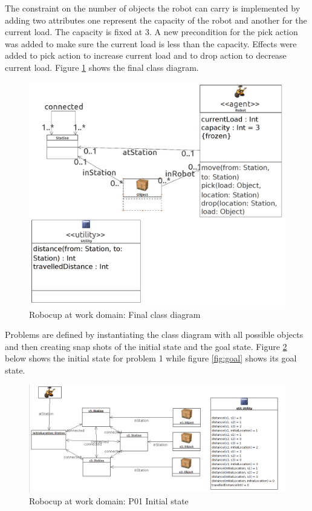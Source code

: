 \documentclass{article}
\begin{document}
The constraint on the number of objects the robot can carry is implemented by adding two attributes one represent the capacity of the robot and another for the current load. The capacity is fixed at 3. A new precondition for the pick action was added to make sure the current load is less than the capacity. Effects were added to pick action to increase current load and to drop action to decrease current load. Figure \ref{fig:class} shows the final class diagram.

\begin{figure}[h] %
	\centering
	\includegraphics[width=12 cm]{figures/class_diagram.png} 
	\caption{Robocup at work domain: Final class diagram}
	\label{fig:class}
\end{figure}

Problems are defined by instantiating the class diagram with all possible objects and then creating snap shots of the initial state and the goal state. Figure \ref{fig:initial} below shows the initial state for problem 1 while figure \ref{fig:goal} shows its goal state.

\begin{figure}[h] %
	\centering
	\includegraphics[width=15 cm]{figures/p01_initial_state.png} 
	\caption{Robocup at work domain: P01 Initial state}
	\label{fig:initial}
\end{figure}
\end{document}
